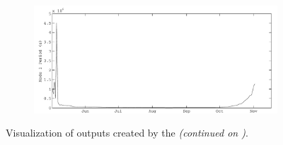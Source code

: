 \begin{figure}
\begin{subfigure}{\lafigsize}
    \includegraphics[width = \linewidth]{figures/Sparkling_ST1.pdf}
  \end{subfigure}
  \caption[Visualization of outputs created by the \la.]{\label{fig:la:outputs:1}Visualization of outputs created by the \la \emph{(continued on )}.}
\end{figure}
